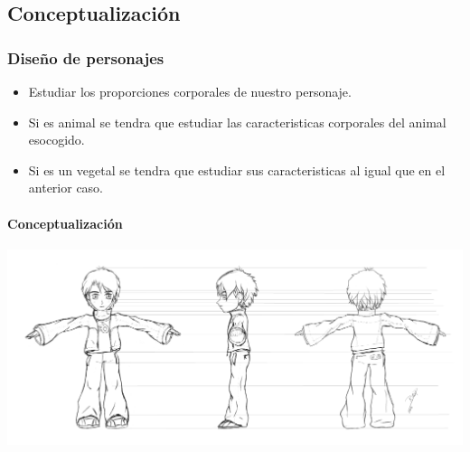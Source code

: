 \documentclass[11pt]{beamer}
\begin{document}
\subsection{Conceptualización}
\begin{frame}
\frametitle{Diseño de personajes}
\begin{itemize}
\item Estudiar los proporciones corporales de nuestro personaje.
\item Si es animal se tendra que estudiar las caracteristicas corporales del animal esocogido.
\item Si es un vegetal se tendra que estudiar sus caracteristicas al igual que en el anterior caso.
\end{itemize}
\framesubtitle{Conceptualización}
\begin{center}
 \includegraphics[scale=0.6,keepaspectratio=true]{img/conceptualizacion.png}
\end{center}
\end{frame}
\end{document}
